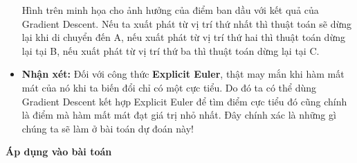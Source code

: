 \begin{itemize}
\begin{figure}[H]
        \end{figure}
    Hình trên minh họa cho ảnh hưởng của điểm ban dầu với kết quả của Gradient Descent. Nếu ta xuất phát từ vị trí thứ nhất thì thuật toán sẽ dừng lại khi di chuyển đến A, nếu xuất phát từ vị trí thứ hai thì thuật toán dừng lại tại B, nếu xuất phát từ vị trí thứ ba thì thuật toán dừng lại tại C.
    \item \textbf{Nhận xét:} Đối với công thức \textbf{Explicit Euler}, thật may mắn khi hàm mất mát của nó khi ta biến đổi chỉ có một cực tiểu. Do đó ta có thể dùng Gradient Descent kết hợp Explicit Euler để tìm điểm cực tiểu đó cũng chính là điểm mà hàm mất mát đạt giá trị nhỏ nhất. Đây chính xác là những gì chúng ta sẽ làm ở bài toán dự đoán này!
\end{itemize}
{\large\textbf{Áp dụng vào bài toán}}

